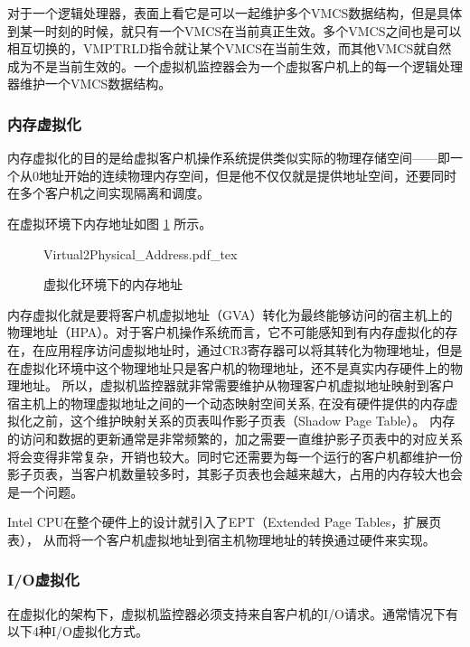 对于一个逻辑处理器，表面上看它是可以一起维护多个VMCS数据结构，但是具体到某一时刻的时候，就只有一个VMCS在当前真正生效。多个VMCS之间也是可以相互切换的，VMPTRLD指令就让某个VMCS在当前生效，而其他VMCS就自然成为不是当前生效的。一个虚拟机监控器会为一个虚拟客户机上的每一个逻辑处理器维护一个VMCS数据结构。

\subsubsection{内存虚拟化}
内存虚拟化的目的是给虚拟客户机操作系统提供类似实际的物理存储空间——即一个从0地址开始的连续物理内存空间，但是他不仅仅就是提供地址空间，还要同时在多个客户机之间实现隔离和调度。

在虚拟环境下内存地址如图 \ref{fig:Virtual2Physical_Address} 所示。
\begin{figure}[htbp]
    \centering
    \def\svgscale{0.5}
    {Virtual2Physical_Address.pdf_tex}
    \caption{虚拟化环境下的内存地址}
    \label{fig:Virtual2Physical_Address}
\end{figure}

内存虚拟化就是要将客户机虚拟地址（GVA）转化为最终能够访问的宿主机上的物理地址（HPA）。对于客户机操作系统而言，它不可能感知到有内存虚拟化的存在，在应用程序访问虚拟地址时，通过CR3寄存器可以将其转化为物理地址，但是在虚拟化环境中这个物理地址只是客户机的物理地址，还不是真实内存硬件上的物理地址。
所以，虚拟机监控器就非常需要维护从物理客户机虚拟地址映射到客户宿主机上的物理虚拟地址之间的一个动态映射空间关系,
在没有硬件提供的内存虚拟化之前，这个维护映射关系的页表叫作影子页表（Shadow Page Table）。
内存的访问和数据的更新通常是非常频繁的，加之需要一直维护影子页表中的对应关系将会变得非常复杂，开销也较大。同时它还需要为每一个运行的客户机都维护一份影子页表，当客户机数量较多时，其影子页表也会越来越大，占用的内存较大也会是一个问题。

Intel CPU在整个硬件上的设计就引入了EPT（Extended Page Tables，扩展页表），
从而将一个客户机虚拟地址到宿主机物理地址的转换通过硬件来实现。


\subsubsection{I/O虚拟化}
在虚拟化的架构下，虚拟机监控器必须支持来自客户机的I/O请求。通常情况下有以下4种I/O虚拟化方式。

